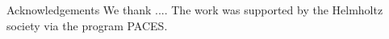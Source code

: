 \begin{subsection}{Acknowledgements}
We thank  ....
The work was supported by the Helmholtz society via the program PACES.
\end{subsection}
\begin{comment}
\begin{subsection}{Adoption of the benthic diagenesis model OMEXDIA}
\end{subsection}

\begin{subsection}{Set-ups and numerical experiments}
\end{subsection}

\begin{section}{RESULTS (standard runs)} 
\end{section}
\begin{normalsize}
\section*{Tables}
\begin{table}[ht] \caption{\footnotesize Relevant symbols used in the text. Abbrev: ESD: equivalent spherical diameter} \vspace{4mm}\label{tab:par} \small \begin{tabular}{llllll}\vspace{8mm} \hrule Symbol &Description&Value &Unit \\\vspace{8mm} \hrule
$f_R$ &Relative N in Rubisco & \\[0.0ex]
$\theta$ &CHL-a content in chloroplasts&2.5/0.14/4.8&g-CHL-a mol-C$^{-1}$\\[0.0ex]
$\imax$ &maximum ingestion rate &&h$^{-1}$\\[-1.3ex]
\vspace{8mm} \hrule \end{tabular} \end{table} 
\end{normalsize}

\end{comment}
